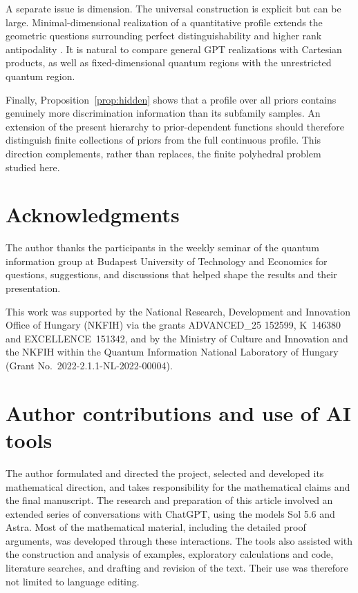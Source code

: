 \documentclass[a4paper,11pt,onecolumn,unpublished]{quantumarticle}
\theoremstyle{definition}
\newcommand{\1}{\mathbf 1}
\begin{document}
A separate issue is dimension. The universal construction is explicit but can
be large. Minimal-dimensional realization of a quantitative profile extends
the geometric questions surrounding perfect distinguishability and higher rank
antipodality \cite{Weiner2025,NaszodiSzilagyiWeiner2025}. It is natural to compare
general GPT realizations with Cartesian products, as well as fixed-dimensional
quantum regions with the unrestricted quantum region.

Finally, Proposition~\ref{prop:hidden} shows that a profile over all priors
contains genuinely more discrimination information than its subfamily samples.
An extension of the present hierarchy to prior-dependent functions should
therefore distinguish finite collections of priors from the full continuous
profile. This direction complements, rather than replaces, the finite
polyhedral problem studied here.

\section*{Acknowledgments}
The author thanks the participants in the weekly seminar of the quantum
information group at Budapest University of Technology and Economics for
questions, suggestions, and discussions that helped shape the results and
their presentation.

This work was supported by the National Research, Development and Innovation
Office of Hungary (NKFIH) via the grants ADVANCED\_25 152599, K~146380 and
EXCELLENCE~151342, and by the Ministry of Culture and Innovation and the NKFIH
within the Quantum Information National Laboratory of Hungary
(Grant No.~2022-2.1.1-NL-2022-00004).

\section*{Author contributions and use of AI tools}
The author formulated and directed the project, selected and developed its
mathematical direction, and takes responsibility for the mathematical claims
and the final manuscript. The research and preparation of this article
involved an extended series of conversations with ChatGPT, using the models
Sol 5.6 and Astra. Most of the mathematical material, including the detailed
proof arguments, was developed through these interactions. The tools also
assisted with the construction and analysis of examples, exploratory
calculations and code, literature searches, and drafting and revision of the
text. Their use was therefore not limited to language editing.
\end{document}

